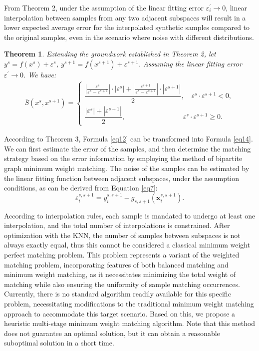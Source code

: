 \documentclass[final,3p,times]{elsarticle}
\newtheorem{theorem}{Theorem}
\begin{document}
From Theorem 2, under the assumption of the linear fitting error 
$\varepsilon_i^\prime\rightarrow0$, linear interpolation between 
samples from any two adjacent subspaces will result in a lower expected 
average error for the interpolated synthetic samples compared to 
the {\color{myred} original}   samples, even in the scenario where noise with different 
distributions. 

\begin{theorem}
\label{the3}
Extending the groundwork established in Theorem 2, let 
$y^s=f(x^s)+\varepsilon^s$, $y^{s+1}=f(x^{s+1})+\varepsilon^{s+1}$.
 Assuming the linear fitting error $\varepsilon^\prime
 \rightarrow0$. We have: 
\begin{equation}
\label{eq14}
\begin{aligned}
\bar{S}(x^s,x^{s+1})
=
\begin{cases} 
\dfrac{|\frac{\varepsilon^s}{\varepsilon^s-\varepsilon^{s+1}}|
\cdot |\varepsilon^{s}|+|\frac{\varepsilon^{s+1}}{\varepsilon^s-
\varepsilon^{s+1}}|\cdot|\varepsilon^{s+1}|}{2},\quad\varepsilon^s
\cdot \varepsilon^{s+1}<0,
\\
\dfrac{|\varepsilon^s|+|\varepsilon^{s+1}|}{2}, 
\;\qquad\qquad\qquad\qquad\varepsilon^s\cdot 
\varepsilon^{s+1}\ge0.
\end{cases}
\end{aligned}
\end{equation}
\end{theorem}


According to Theorem 3, Formula \eqref{eq12} can be transformed into 
Formula \eqref{eq14}. We can first estimate the error of the samples, 
and then determine the matching strategy based on the error 
information by employing the method of bipartite graph minimum 
weight matching. The noise of the samples can be estimated by the 
linear fitting function between adjacent subspaces, under the 
assumption conditions, as can be derived from Equation \eqref{eq7}:
\begin{equation} 
\label{eq15}
\varepsilon_i^{s,s+1}=y_i^{s,s+1}-g_{s,s+1}(\boldsymbol{x}_i^
{s,s+1}).
\end{equation} 

According to interpolation rules, each sample is mandated to 
undergo at least one interpolation, and the total number of 
interpolations is constrained. After optimization with the KNN, 
the number of samples between subspaces is not always exactly 
equal, thus this cannot be considered a classical minimum weight perfect 
matching problem. This problem represents a variant of the 
weighted matching problem, incorporating features of both 
balanced matching and minimum weight matching, as it necessitates 
minimizing the total weight of matching while also ensuring the 
uniformity of sample matching occurrences. Currently, there is 
no standard algorithm readily available for this specific 
problem, necessitating modifications to the traditional minimum 
weight matching approach to accommodate this target scenario. 
Based on this, we propose a heuristic multi-stage minimum weight 
matching algorithm. Note that this method does not guarantee an 
optimal solution, but it can obtain a reasonable suboptimal 
solution in a short time.
\end{document}
